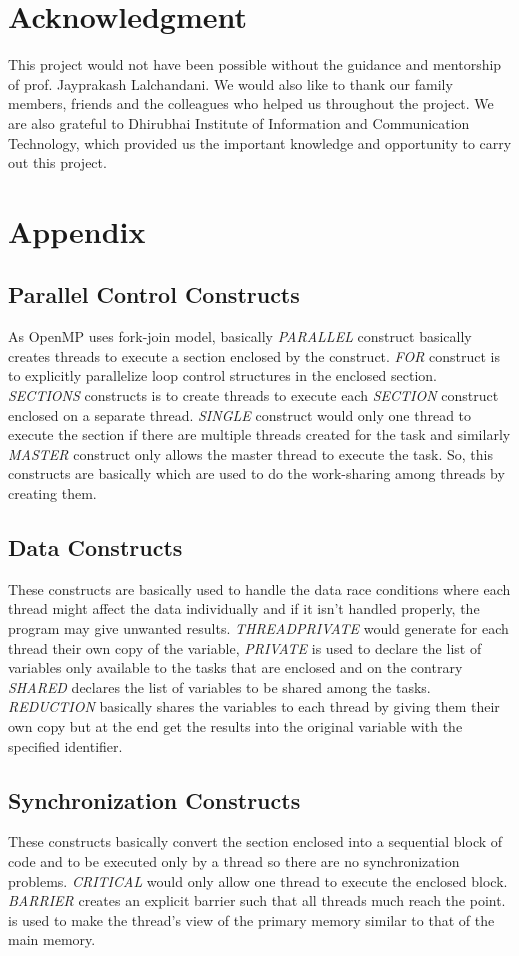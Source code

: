 \documentclass[conference]{IEEEtran}
\begin{document}
\section*{Acknowledgment}
This project would not have been possible without the guidance and mentorship of prof. Jayprakash Lalchandani. We would also like to thank our family members, friends and the colleagues who helped us throughout the project. We are also grateful to Dhirubhai Institute of Information and Communication Technology, which provided us the important knowledge and opportunity to carry out this project.


\section*{Appendix}
\subsection{Parallel Control Constructs}
As OpenMP uses fork-join model, basically \emph{PARALLEL} construct basically creates threads to execute a section enclosed by the construct. \emph{FOR} construct is to explicitly parallelize loop control structures in the enclosed section. \emph{SECTIONS} constructs is to create threads to execute each \emph{SECTION} construct enclosed on a separate thread. \emph{SINGLE} construct would only one thread to execute the section if there are multiple threads created for the task and similarly \emph{MASTER} construct only allows the master thread to execute the task. So, this constructs are basically which are used to do the work-sharing among threads by creating them.
\subsection{Data Constructs}
These constructs are basically used to handle the data race conditions where each thread might affect the data individually and if it isn't handled properly, the program may give unwanted results. \emph{THREADPRIVATE} would generate for each thread their own copy of the variable, \emph{PRIVATE} is used to declare the list of variables only available to the tasks that are enclosed and on the contrary \emph{SHARED} declares the list of variables to be shared among the tasks. \emph{REDUCTION} basically shares the variables to each thread by giving them their own copy but at the end get the results into the original variable with the specified identifier.
\subsection{Synchronization Constructs}
These constructs basically convert the section enclosed into a sequential block of code and to be executed only by a thread so there are no synchronization problems. \emph{CRITICAL} would only allow one thread to execute the enclosed block. \emph{BARRIER} creates an explicit barrier such that all threads much reach the point.  is used to make the thread's view of the primary memory similar to that of the main memory.
\end{document}
